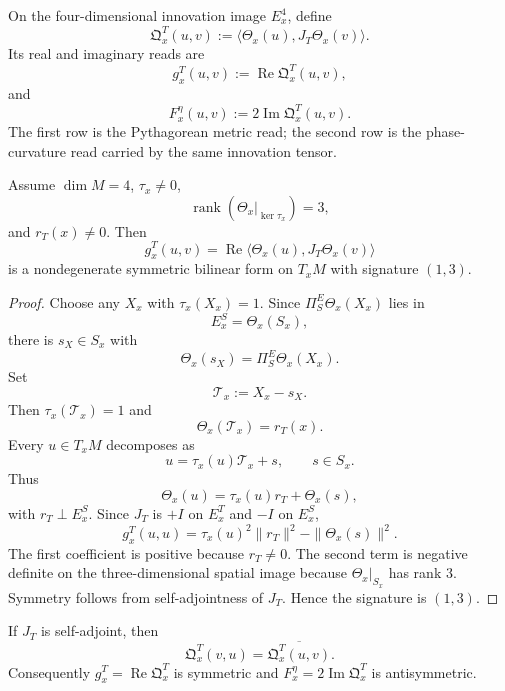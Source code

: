 \begin{definition}
\label{def:innovation-soldering-lorentzized-innovation-tensor}
On the four-dimensional innovation image $E_x^4$, define
$$
\mathfrak Q^T_x(u,v)
:=
\langle
\Theta_x(u),
J_T\Theta_x(v)
\rangle.
$$
Its real and imaginary reads are
$$
g_x^T(u,v):=\operatorname{Re}\mathfrak Q^T_x(u,v),
$$
and
$$
F_x^\eta(u,v):=2\operatorname{Im}\mathfrak Q^T_x(u,v).
$$
The first row is the Pythagorean metric read; the second row is the
phase-curvature read carried by the same innovation tensor.
\end{definition}

\begin{theorem}
\label{thm:innovation-soldering-tick-reflected-gram-lorentz}
Assume $\dim M=4$, $\tau_x\ne0$,
$$
\operatorname{rank}(\Theta_x|_{\ker\tau_x})=3,
$$
and $r_T(x)\ne0$. Then
$$
g_x^T(u,v)
=
\operatorname{Re}
\langle
\Theta_x(u),
J_T\Theta_x(v)
\rangle
$$
is a nondegenerate symmetric bilinear form on $T_xM$ with signature
$(1,3)$.
\end{theorem}

\begin{proof}
Choose any $X_x$ with $\tau_x(X_x)=1$. Since
$\Pi_S^E\Theta_x(X_x)$ lies in
$$
E_x^S=\Theta_x(S_x),
$$
there is $s_X\in S_x$ with
$$
\Theta_x(s_X)=\Pi_S^E\Theta_x(X_x).
$$
Set
$$
\mathcal T_x:=X_x-s_X.
$$
Then $\tau_x(\mathcal T_x)=1$ and
$$
\Theta_x(\mathcal T_x)=r_T(x).
$$
Every $u\in T_xM$ decomposes as
$$
u=\tau_x(u)\mathcal T_x+s,
\qquad
s\in S_x.
$$
Thus
$$
\Theta_x(u)=\tau_x(u)r_T+\Theta_x(s),
$$
with $r_T\perp E_x^S$. Since $J_T$ is $+I$ on $E_x^T$ and $-I$ on
$E_x^S$,
$$
g_x^T(u,u)
=
\tau_x(u)^2\|r_T\|^2
-
\|\Theta_x(s)\|^2.
$$
The first coefficient is positive because $r_T\ne0$. The second term is
negative definite on the three-dimensional spatial image because
$\Theta_x|_{S_x}$ has rank $3$. Symmetry follows from self-adjointness of
$J_T$. Hence the signature is $(1,3)$.
\end{proof}

\begin{theorem}
\label{thm:innovation-soldering-real-imaginary-shared-source}
If $J_T$ is self-adjoint, then
$$
\mathfrak Q^T_x(v,u)=\overline{\mathfrak Q^T_x(u,v)}.
$$
Consequently $g_x^T=\operatorname{Re}\mathfrak Q^T_x$ is symmetric and
$F_x^\eta=2\operatorname{Im}\mathfrak Q^T_x$ is antisymmetric.
\end{theorem}

